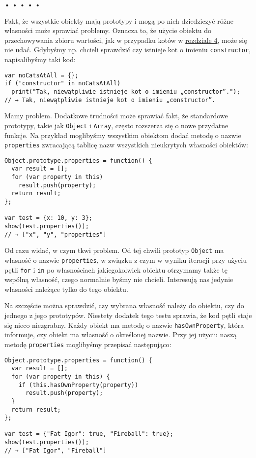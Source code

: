 \begin{center}
• • • • •
\end{center}

  
Fakt, że wszystkie obiekty mają prototypy i mogą po nich dziedziczyć różne własności może sprawiać problemy. Oznacza to, że użycie obiektu do przechowywania zbioru wartości, jak w przypadku kotów w \hyperref[chap:4]{rozdziale 4}, może się nie udać. Gdybyśmy np. chcieli sprawdzić czy istnieje kot o imieniu \texttt{constructor}, napisalibyśmy taki kod:

  
\begin{verbatim} 
var noCatsAtAll = {};
if ("constructor" in noCatsAtAll)
  print("Tak, niewątpliwie istnieje kot o imieniu „constructor”.");
// → Tak, niewątpliwie istnieje kot o imieniu „constructor”.
\end{verbatim}
  
Mamy problem. Dodatkowe trudności może sprawiać fakt, że standardowe prototypy, takie jak \texttt{Object} i \texttt{Array}, często  rozszerza się o nowe przydatne funkcje. Na przykład moglibyśmy wszystkim obiektom dodać metodę o nazwie \texttt{properties} zwracającą tablicę nazw wszystkich nieukrytych własności obiektów:

  
\begin{verbatim} 
Object.prototype.properties = function() {
  var result = [];
  for (var property in this)
    result.push(property);
  return result;
};

var test = {x: 10, y: 3};
show(test.properties());
// → ["x", "y", "properties"]
\end{verbatim}
  
Od razu widać, w czym tkwi problem. Od tej chwili prototyp \texttt{Object} ma własność o nazwie \texttt{properties}, w związku z czym w wyniku iteracji przy użyciu pętli \texttt{for} i \texttt{in} po własnościach jakiegokolwiek obiektu otrzymamy także tę wspólną własność, czego normalnie byśmy nie chcieli. Interesują nas jedynie własności należące tylko do tego obiektu.

  
Na szczęście można sprawdzić, czy wybrana własność należy do obiektu, czy do jednego z jego prototypów. Niestety dodatek tego testu sprawia, że kod pętli staje się nieco niezgrabny. Każdy obiekt ma metodę o nazwie \texttt{hasOwnProperty}, która informuje, czy obiekt ma własność o określonej nazwie. Przy jej użyciu naszą metodę \texttt{properties} moglibyśmy przepisać następująco:

  
\begin{verbatim} 
Object.prototype.properties = function() {
  var result = [];
  for (var property in this) {
    if (this.hasOwnProperty(property))
      result.push(property);
  }
  return result;
};

var test = {"Fat Igor": true, "Fireball": true};
show(test.properties());
// → ["Fat Igor", "Fireball"]
\end{verbatim}
  
